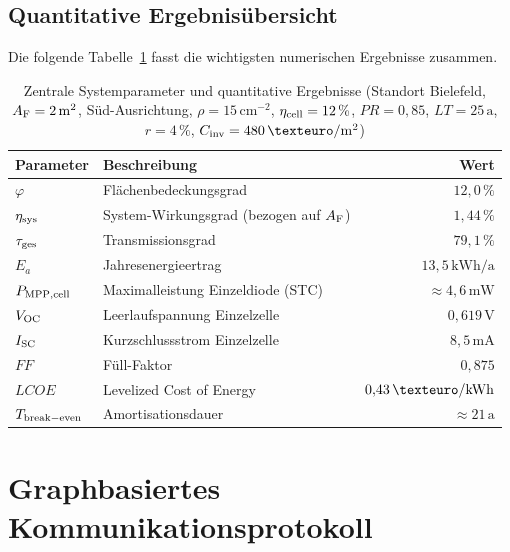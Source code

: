 ﻿\documentclass[a4paper,12pt]{article}
\theoremstyle{definition}
\theoremstyle{remark}
\newcommand{\vph}{\varphi}
\begin{document}
\subsection{Quantitative Ergebnisübersicht}

Die folgende Tabelle~\ref{tab:ergebnisse} fasst die wichtigsten numerischen
Ergebnisse zusammen.

\begin{table}[H]
  \centering
  \renewcommand{\arraystretch}{1.3}
  \caption{Zentrale Systemparameter und quantitative Ergebnisse (Standort Bielefeld,
    $A_{\rm F} = 2\,\mathrm{m^2}$, Süd-Ausrichtung, $\rho = 15\,\mathrm{cm}^{-2}$,
    $\eta_{\rm cell} = 12\,\%$, $PR = 0{,}85$, $LT = 25\,\mathrm{a}$,
    $r = 4\,\%$, $C_{\rm inv} = 480\,\mathrm{\texteuro/m^2}$)}
  \label{tab:ergebnisse}
  \begin{tabularx}{\textwidth}{lXr}
    \toprule
    \textbf{Parameter} & \textbf{Beschreibung} & \textbf{Wert}\\
    \midrule
    $\vph$ & Flächenbedeckungsgrad & $12{,}0\,\%$\\
    $\eta_{\rm sys}$ & System-Wirkungsgrad (bezogen auf $A_{\rm F}$) & $1{,}44\,\%$\\
    $\tau_{\rm ges}$ & Transmissionsgrad & $79{,}1\,\%$\\
    $E_a$ & Jahresenergieertrag & $13{,}5\,\mathrm{kWh/a}$\\
    $P_{\rm MPP,cell}$ & Maximalleistung Einzeldiode (STC) & $\approx 4{,}6\,\mathrm{mW}$\\
    $V_{\rm OC}$ & Leerlaufspannung Einzelzelle & $0{,}619\,\mathrm{V}$\\
    $I_{\rm SC}$ & Kurzschlussstrom Einzelzelle & $8{,}5\,\mathrm{mA}$\\
    $FF$ & Füll-Faktor & $0{,}875$\\
    $LCOE$ & Levelized Cost of Energy & $0{,}43\,\mathrm{\texteuro/kWh}$\\
    $T_{\rm break-even}$ & Amortisationsdauer & $\approx 21\,\mathrm{a}$\\
    \bottomrule
  \end{tabularx}
\end{table}

\section{Graphbasiertes Kommunikationsprotokoll}
\label{sec:kommunikation}
\end{document}
